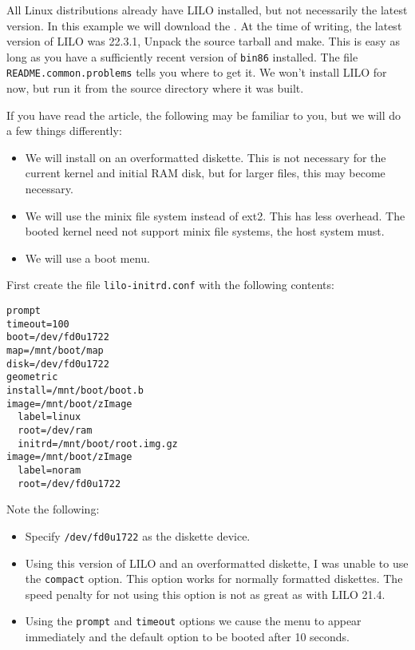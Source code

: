 \documentclass[12pt,a4paper]{article}
\begin{document}
All Linux distributions already have LILO installed, but not
necessarily the latest version. In this example we will download the
. At the time of writing, the
latest version of LILO was 22.3.1, Unpack the source tarball and
make. This is easy as long as you have a sufficiently recent version
of {\tt bin86} installed. The file {\tt README.common.problems} tells
you where to get it. We won't install LILO for now, but run it from
the source directory where it was built.

If you have read the  article, the
following may be familiar to you, but we will do a few things
differently:
\begin{itemize}
\item We will install on an overformatted diskette. This is not
  necessary for the current kernel and initial RAM disk, but for
  larger files, this may become necessary.
\item We will use the minix file system instead of ext2. This has less
  overhead. The booted kernel need not support minix file systems, the
  host system must.
\item We will use a boot menu.
\end{itemize}

First create the file {\tt lilo-initrd.conf} with the following
contents:
\begin{verbatim}
prompt
timeout=100
boot=/dev/fd0u1722
map=/mnt/boot/map
disk=/dev/fd0u1722
geometric
install=/mnt/boot/boot.b
image=/mnt/boot/zImage
  label=linux
  root=/dev/ram
  initrd=/mnt/boot/root.img.gz
image=/mnt/boot/zImage
  label=noram
  root=/dev/fd0u1722
\end{verbatim}

Note the following:
\begin{itemize}
\item Specify {\tt /dev/fd0u1722} as the diskette device.
\item Using this version of LILO and an overformatted diskette, I was unable
to use the {\tt compact} option. This option works for normally
formatted diskettes. The speed penalty for not using this
option is not as great as with LILO 21.4.
\item Using the {\tt prompt} and {\tt timeout} options we cause the
  menu to appear immediately and the default option to be booted after
  10 seconds.
\end{itemize}
\end{document}
